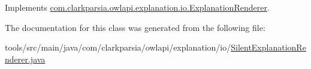 Implements \hyperlink{interfacecom_1_1clarkparsia_1_1owlapi_1_1explanation_1_1io_1_1_explanation_renderer_ac9cc604e6a0e148f2e2ceb305694651a}{com.\-clarkparsia.\-owlapi.\-explanation.\-io.\-Explanation\-Renderer}.



The documentation for this class was generated from the following file\-:\begin{DoxyCompactItemize}
\item 
tools/src/main/java/com/clarkparsia/owlapi/explanation/io/\hyperlink{_silent_explanation_renderer_8java}{Silent\-Explanation\-Renderer.\-java}\end{DoxyCompactItemize}
